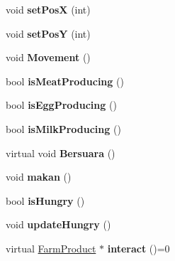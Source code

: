 \begin{DoxyCompactItemize}
void {\bfseries set\+PosX} (int)
\item 
\mbox{\label{class_farm_animal_aac8d44231fef56667172cab7aec28b4c}} 
void {\bfseries set\+PosY} (int)
\item 
\mbox{\label{class_farm_animal_ac415dd336b118052206048940c734c90}} 
void {\bfseries Movement} ()
\item 
\mbox{\label{class_farm_animal_a3c7244a2b4e29a092050da2d19a23579}} 
bool {\bfseries is\+Meat\+Producing} ()
\item 
\mbox{\label{class_farm_animal_ae3ddcc39f33304eab628492d4b3c354c}} 
bool {\bfseries is\+Egg\+Producing} ()
\item 
\mbox{\label{class_farm_animal_af1820e795edd1dfb8782e221610f7539}} 
bool {\bfseries is\+Milk\+Producing} ()
\item 
\mbox{\label{class_farm_animal_a81c3248469df366275a8350d6c43191a}} 
virtual void {\bfseries Bersuara} ()
\item 
\mbox{\label{class_farm_animal_a0aff6930d7226b425ea38f202e1d0357}} 
void {\bfseries makan} ()
\item 
\mbox{\label{class_farm_animal_adcfec948b4f9dd777207529006c66753}} 
bool {\bfseries is\+Hungry} ()
\item 
\mbox{\label{class_farm_animal_a9cc75d414ae6e51adbb5040e9e4a453b}} 
void {\bfseries update\+Hungry} ()
\item 
\mbox{\label{class_farm_animal_ac3f617b7cf87dad4d20de867b49410fa}} 
virtual \mbox{\hyperlink{class_farm_product}{Farm\+Product}} $\ast$ {\bfseries interact} ()=0
\end{DoxyCompactItemize}
